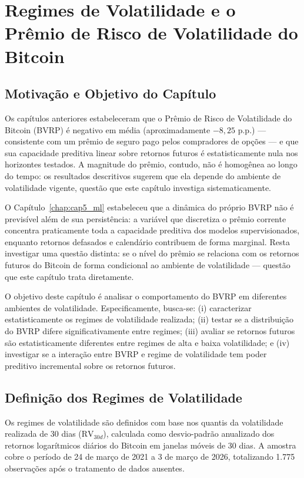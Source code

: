 ﻿\chapter{Regimes de Volatilidade e o Prêmio de Risco de Volatilidade do Bitcoin}
\label{chap:regimes}

\section{Motivação e Objetivo do Capítulo}
\label{sec:cap9_motivacao}

Os capítulos anteriores estabeleceram que o Prêmio de Risco de
Volatilidade do Bitcoin (BVRP) é negativo em média (aproximadamente
$-8{,}25$ p.p.) --- consistente com um prêmio de seguro pago pelos
compradores de opções --- e que sua capacidade preditiva linear sobre
retornos futuros é estatisticamente nula nos horizontes testados. A
magnitude do prêmio, contudo, não é homogênea ao longo do tempo: os
resultados descritivos sugerem que ela depende do ambiente de
volatilidade vigente, questão que este capítulo investiga
sistematicamente.

O Capítulo~\ref{chap:cap5_ml} estabeleceu que a dinâmica do próprio
BVRP não é previsível além de sua persistência: a variável que
discretiza o prêmio corrente concentra praticamente toda a capacidade
preditiva dos modelos supervisionados, enquanto retornos defasados e
calendário contribuem de forma marginal. Resta investigar uma questão
distinta: se o nível do prêmio se relaciona com os retornos futuros do
Bitcoin de forma condicional ao ambiente de volatilidade --- questão
que este capítulo trata diretamente.

O objetivo deste capítulo é analisar o comportamento do BVRP em diferentes ambientes
de volatilidade. Especificamente, busca-se: (i) caracterizar estatisticamente os
regimes de volatilidade realizada; (ii) testar se a distribuição do BVRP difere
significativamente entre regimes; (iii) avaliar se retornos futuros são estatisticamente
diferentes entre regimes de alta e baixa volatilidade; e (iv) investigar se a
interação entre BVRP e regime de volatilidade tem poder preditivo incremental sobre
os retornos futuros.

\section{Definição dos Regimes de Volatilidade}
\label{sec:cap9_regimes}

Os regimes de volatilidade são definidos com base nos quantis da volatilidade realizada
de 30 dias ($\text{RV}_{30d}$), calculada como desvio-padrão anualizado dos retornos
logarítmicos diários do Bitcoin em janelas móveis de 30 dias. A amostra cobre o período
de 24 de março de 2021 a 3 de março de 2026, totalizando 1.775 observações após
o tratamento de dados ausentes.

